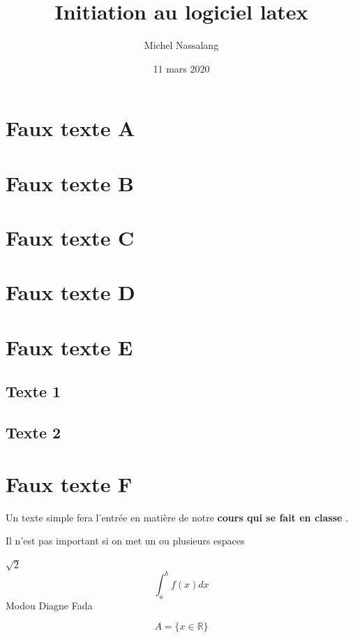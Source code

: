 \documentclass[12pt,a4paper]{article}
\title{Initiation au logiciel latex}
\author{Michel Nassalang}
\date{11 mars 2020}
\begin{document}
\maketitle
\tableofcontents
\newpage
\section{Faux texte A}
{\color{blue!20!red} \bf \lipsum[5]}
\section{Faux texte B}
\lipsum[1]
\section{Faux texte C}
\textsf{\lipsum[7]}
\section{Faux texte D}
\lipsum[8]
\section{Faux texte E}
\subsection{Texte 1}
\lipsum[10]
\subsection{Texte 2}
\lipsum[11]
\section*{Faux texte F}
\lipsum[4]
\vspace{2 cm}
Un texte simple fera l'entrée en matière de notre {\color{blue!20!red} \bf cours qui se fait en classe } .

Il n'est pas \hspace{1 cm} important si\hspace{1 cm} on met un ou plusieurs espaces

$\sqrt{2}$ %
$$\int_a^b f(x)dx $$
Modou \hfill Diagne \hfill Fada


$$ A=\{ x \in \mathbb{R} \} $$
\end{document}
